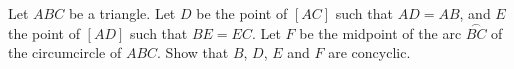 Let $ABC$ be a triangle. Let $D$ be the point of $[AC]$ such that $AD = AB$, and $E$ the point of $[AD]$ such that $BE = EC$. Let $F$ be the midpoint of the arc $\overset{\frown}{BC}$ of the circumcircle of $ABC$. Show that $B$, $D$, $E$ and $F$ are concyclic.
